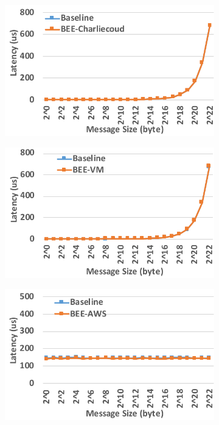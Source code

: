 \begin{figure}[t]
    \centering
    \begin{subfigure}[t]{0.245\textwidth}
        \includegraphics[width=\textwidth]{figures/lat-bee-cc.pdf}
    \end{subfigure}
    \begin{subfigure}[t]{0.245\textwidth}
        \includegraphics[width=\textwidth]{figures/lat-bee-vm.pdf}
    \end{subfigure}
    \begin{subfigure}[t]{0.245\textwidth}
        \includegraphics[width=\textwidth]{figures/lat-bee-aws.pdf}

\end{subfigure}
\end{figure}
